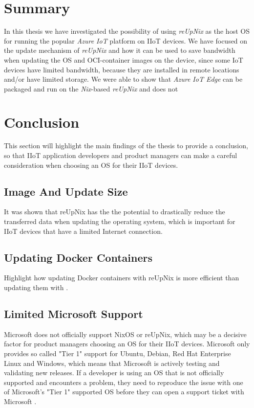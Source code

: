 \section{Summary}
In this thesis we have investigated the possibility of using \textit{reUpNix} as the
host \ac{OS} for running the popular \textit{Azure IoT} platform on \ac{IIoT} devices.
We have focused on the update mechanism of \textit{reUpNix} and how it can be used
to save bandwidth when updating the \ac{OS} and \ac{OCI}-container images on the device,
since some \ac{IoT} devices have limited bandwidth, because they are installed in
remote locations and/or have limited storage. We were able to show that \textit{Azure IoT Edge}
can be packaged and run on the \textit{Nix}-based \textit{reUpNix} and does not


\section{Conclusion}
This section will highlight the main findings of the thesis to provide a
conclusion, so that \ac{IIoT} application developers and product managers can
make a careful consideration when choosing an \ac{OS} for their \ac{IIoT} devices.

\subsection{Image And Update Size}
It was shown that reUpNix has the the potential to drastically reduce the transferred
data when updating the operating system, which is important for \ac{IIoT} devices
that have a limited Internet connection.

\subsection{Updating Docker Containers}

\begin{tcolorbox}[title=TODO]
    Highlight how updating Docker containers with reUpNix is more efficient than
    updating them with .
\end{tcolorbox}

\subsection{Limited Microsoft Support}
Microsoft does not officially support NixOS or reUpNix, which may be a decisive factor
for product managers choosing an \ac{OS} for their \ac{IIoT} devices. Microsoft
only provides so called "Tier 1" support for Ubuntu, Debian, Red Hat Enterprise
Linux and Windows, which means that Microsoft is actively testing and validating
new releases. If a developer is using an \ac{OS} that is not officially supported
and encounters a problem, they need to reproduce the issue with one of Microsoft's
"Tier 1" supported \ac{OS} before they can open a support ticket with Microsoft
\cite{msdoc-supportetplatforms}.

